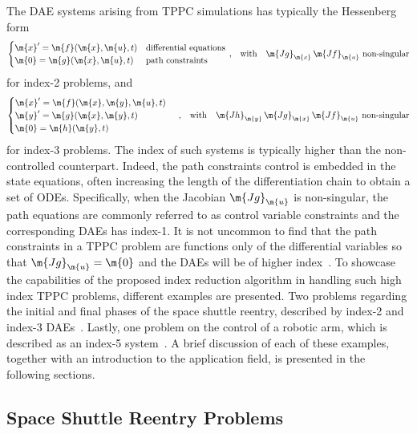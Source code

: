 The \ac{DAE} systems arising from \ac{TPPC} simulations has typically the Hessenberg form~\cite{brenan1986numerical}
%
\begin{equation*}
  \begin{cases}
    \m{x}^\prime = \m{f}(\m{x}, \m{u}, t) & \text{differential equations} \\
    \m{0}        = \m{g}(\m{x}, \m{u}, t) & \text{path constraints}
  \end{cases} \, \text{,}
  \quad \text{with} \quad \m{Jg}_{\m{x}} \, \m{Jf}_{\m{u}} ~ \text{non-singular}
  \label{chap4:eq:tppc_dae_index2}
\end{equation*}
%
for index-2 problems, and
%
\begin{equation*}
  \begin{cases}
    \m{x}^\prime = \m{f}(\m{x}, \m{y}, \m{u}, t) \\
    \m{y}^\prime = \m{g}(\m{x}, \m{y}, t) \\
    \m{0}        = \m{h}(\m{y}, t)
  \end{cases} \, \text{,}
  \quad \text{with} \quad \m{Jh}_{\m{y}} \, \m{Jg}_{\m{x}} \, \m{Jf}_{\m{u}} ~ \text{non-singular}
  \label{chap4:eq:tppc_dae_index3}
\end{equation*}
%
for index-3 problems. The index of such systems is typically higher than the non-controlled counterpart. Indeed, the path constraints control is embedded in the state equations, often increasing the length of the differentiation chain to obtain a set of \acp{ODE}. Specifically, when the Jacobian $\m{Jg}_{\m{u}}$ is non-singular, the path equations are commonly referred to as control variable constraints and the corresponding \acp{DAE} has index-1. It is not uncommon to find that the path constraints in a \ac{TPPC} problem are functions only of the differential variables so that $\m{Jg}_{\m{u}} = \m{0}$ and the \acp{DAE} will be of higher index~\cite{brenan1995numerical}. To showcase the capabilities of the proposed index reduction algorithm in handling such high index \ac{TPPC} problems, different examples are presented. Two problems regarding the initial and final phases of the space shuttle reentry, described by index-2 and index-3 \acp{DAE}~\cite{brenan1995numerical}. Lastly, one problem on the control of a robotic arm, which is described as an index-5 system~\cite{pryce1998solving}. A brief discussion of each of these examples, together with an introduction to the application field, is presented in the following sections.

\subsection{Space Shuttle Reentry Problems}

